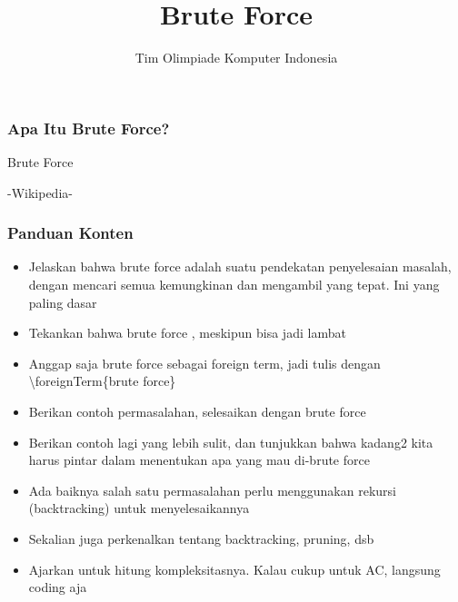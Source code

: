 

\title{Brute Force}
\author{Tim Olimpiade Komputer Indonesia}
\date{}



\begin{frame}
\titlepage
\end{frame}

\begin{frame}
\frametitle{Apa Itu Brute Force?}

\begin{block}{Brute Force}

-Wikipedia-
\end{block}

\end{frame}

\begin{frame}
\frametitle{Panduan Konten}
\begin{itemize}
  \item Jelaskan bahwa brute force adalah suatu pendekatan penyelesaian masalah, dengan mencari semua kemungkinan dan mengambil yang tepat. Ini yang paling dasar
  \item Tekankan bahwa brute force , meskipun bisa jadi lambat
  \item Anggap saja brute force sebagai foreign term, jadi tulis dengan \textbackslash foreignTerm\{brute force\}
  \item Berikan contoh permasalahan, selesaikan dengan brute force
  \item Berikan contoh lagi yang lebih sulit, dan tunjukkan bahwa kadang2 kita harus pintar dalam menentukan apa yang mau di-brute force
  \item Ada baiknya salah satu permasalahan perlu menggunakan rekursi (backtracking) untuk menyelesaikannya
  \item Sekalian juga perkenalkan tentang backtracking, pruning, dsb
  \item Ajarkan untuk hitung kompleksitasnya. Kalau cukup untuk AC, langsung coding aja
\end{itemize}
\end{frame}

